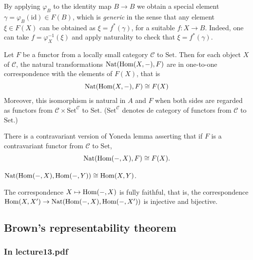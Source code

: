 \begin{remark}
\label{remark-apply-b-ident-map-b-b-we}
	By applying $\varphi_{B}$ to the identity
	map  $B\to B$ we obtain a special element
	$\gamma=\varphi_{B}(\text{id})\in F(B)$,
	which is \textit{generic} in the sense that
	any element $\xi \in F(X)$ can be obtained
	as $\xi=f^{*} (\gamma)$, for a suitable
	$f:X\to B$. Indeed, one can take
	$f=\varphi^{-1}_{X}(\xi)$ and apply
	naturality to check that
	$\xi=f^{*}(\gamma)$.
\end{remark}


\begin{lemma}
\label{lemma-yoned-https-en-wikip-org-wiki}
	Let $F$ be a functor from a locally small
	category $\mathcal{C}$ to $\text{Set}$. Then
	for each object $X$ of $\mathcal{C}$, the
	natural transformations
	$\text{Nat}(\mathop{\mathrm{Hom}}\nolimits(X,-),F)$ are in one-to-one
	correspondence with the elements of $F(X)$,
	that is
	$$\text{Nat}(\mathop{\mathrm{Hom}}\nolimits(X,-), F)\cong F(X)$$
Moreover, this isomorphism is natural in $A$
and $F$ when both sides are regarded as
functors from
$\mathcal{C}\times\text{Set}^{\mathcal{C}}$
to $\text{Set}$. ($\text{Set}^{\mathcal{C}}$
denotes de category of functors from
$\mathcal{C}$ to $\text{Set}$.)

	There is a contravariant version of Yoneda
	lemma asserting that if $F$ is a
	contravariant functor from $\mathcal{C}$ to
	$\text{Set}$,
	$$\text{Nat}(\mathop{\mathrm{Hom}}\nolimits(-,X), F)\cong F(X).$$
\end{lemma}
\begin{lemma}
\label{lemma-nat-x-y-hom-x-y}
	$\text{Nat}
	(\mathop{\mathrm{Hom}}\nolimits(-,X),\mathop{\mathrm{Hom}}\nolimits(-,Y))\cong\text{Hom}(X,Y)$.
\end{lemma}
\begin{remark}
\label{remark-corre-x-x-fully-faith-corre}
	The correspondence $X\mapsto\mathop{\mathrm{Hom}}\nolimits(-,X)$ is
	fully faithful, that is, the correspondence
	$\mathop{\mathrm{Hom}}\nolimits(X,X')\to\text{Nat}(\text{Hom}(-,X),
	\text{Hom}(-,X'))$
	is injective and bijective.
\end{remark}

\subsection{Brown's representability theorem}
\label{subsection-brown-s-repre-theor}

\subsubsection{In lecture13.pdf}
\label{subsection-in-lecture13-pdf}

